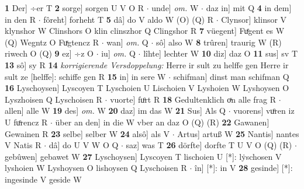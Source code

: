 \documentclass[8pt,a4paper,notitlepage]{article}
\begin{document}
\begin{table}[ht]
\begin{minipage}[t]{0.5\linewidth}
\textbf{1} Der] ÷er T \textbf{2} sorge] sorgen U V O R  $\cdot$ unde] \textit{om.} W  $\cdot$ daz in] mit Q \textbf{4} in dem] in den R  $\cdot$ fôreht] forheht T \textbf{5} dâ] do V aldo W (O) (Q) R  $\cdot$ Clynsor] klinsor V klynshor W Clinshors O klin clinszhor Q Clingshor R \textbf{7} vüegent] Fuͤgent es W (Q) Wegntz O Fuͯgtencz R  $\cdot$ wan] \textit{om.} Q  $\cdot$ sô] also W \textbf{8} trûren] traurig W (R) riwech O (Q) \textbf{9} ez] ÷z O  $\cdot$ iu] \textit{om.} Q  $\cdot$ lîhte] lechter W \textbf{10} diz] daz O \textbf{11} sus] sv T \textbf{13} sô] sy R \textbf{14} \textit{korrigierende Versdoppelung:} Herre ir sult zu helffe gen Herre ir sult ze [helffe]: schiffe gen R  \textbf{15} in] in sere W  $\cdot$ schifman] dinst man schifman Q \textbf{16} Lyschoysen] Lyscoyen T Lyschoien U Lischoien V Lyshoien W Lyshoysen O Lyszhoisen Q Lyschoisen R  $\cdot$ vuorte] fuͦrt R \textbf{18} Gedultenklich oͯn alle frag R  $\cdot$ allen] alle W \textbf{19} des] \textit{om.} W \textbf{20} daz] im das W \textbf{21} Sus] Als Q  $\cdot$ vuorens] vuͦren iz U fuͦrencz R  $\cdot$ über an den] in die W vber an daz O (Q) (R) \textbf{22} Gawanen] Gewainen R \textbf{23} selbe] selber W \textbf{24} alsô] als V  $\cdot$ Artus] artuß W \textbf{25} Nantis] nantes V Natis R  $\cdot$ dâ] do U V W O Q  $\cdot$ saz] was T \textbf{26} dörfte] dorfte T U V O (Q) (R)  $\cdot$ gebûwen] gebawet W \textbf{27} Lyschoysen] Lyscoyen T lischoien U [*]: lẏschosen V lyshoien W Lyshoysen O lishoysen Q Lyschoisen R  $\cdot$ în] [*]: in V \textbf{28} gesinde] [*]: ingesinde V geside W \newline
\end{minipage}
\end{table}
\end{document}
